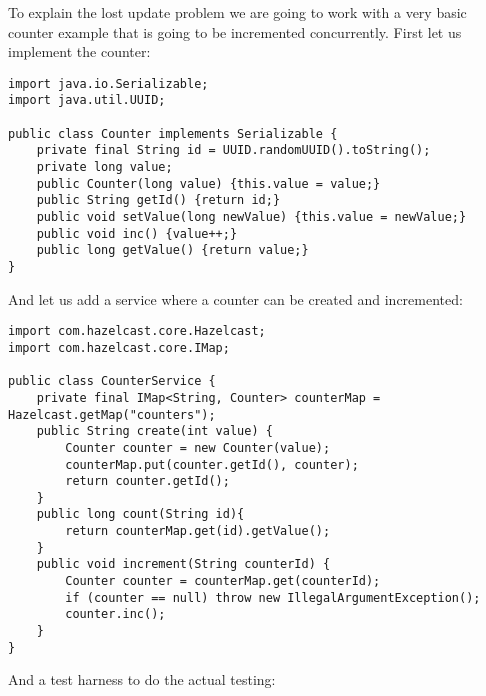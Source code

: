 To explain the lost update problem we are going to work with a very basic counter example that is
going to be incremented concurrently. First let us implement the counter:

\begin{verbatim}
import java.io.Serializable;
import java.util.UUID;

public class Counter implements Serializable {
    private final String id = UUID.randomUUID().toString();
    private long value;
    public Counter(long value) {this.value = value;}
    public String getId() {return id;}
    public void setValue(long newValue) {this.value = newValue;}
    public void inc() {value++;}
    public long getValue() {return value;}
}
\end{verbatim}

And let us add a service where a counter can be created and incremented:

\begin{verbatim}
import com.hazelcast.core.Hazelcast;
import com.hazelcast.core.IMap;

public class CounterService {
    private final IMap<String, Counter> counterMap = Hazelcast.getMap("counters");
    public String create(int value) {
        Counter counter = new Counter(value);
        counterMap.put(counter.getId(), counter);
        return counter.getId();
    }
    public long count(String id){
        return counterMap.get(id).getValue();
    }
    public void increment(String counterId) {
        Counter counter = counterMap.get(counterId);
        if (counter == null) throw new IllegalArgumentException();
        counter.inc();
    }
}
\end{verbatim}

And a test harness to do the actual testing:

